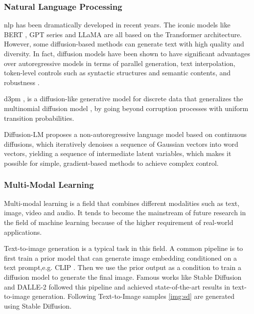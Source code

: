 \documentclass[12pt,DIV14,BCOR12mm,a4paper,footinclude=false,headinclude,parskip=half-,twoside,openright,cleardoublepage=empty,toc=index,bibliography=totoc,listof=totoc]{scrreprt}
\numberwithin{equation}{chapter}
\begin{document}
\subsubsection{Natural Language Processing}
\gls{nlp} has been dramatically developed in recent years. The iconic models like BERT \cite{devlin2019bert}, GPT series \cite{Radford2018ImprovingLU} and LLaMA \cite{touvron2023llama} are all based on the Transformer architecture. However, some diffusion-based methods can generate text with high quality and diversity. In fact, diffusion models have been shown to have significant advantages over autoregressive models in terms of parallel generation, text interpolation, token-level controls such as syntactic structures and semantic contents, and robustness \cite{zou2023survey}.

\gls{d3pm} \cite{austin2023structured}, is a diffusion-like generative model for discrete data that generalizes the multinomial diffusion model \cite{hoogeboom2021argmax}, by going beyond corruption processes with uniform transition probabilities. 

Diffusion-LM \cite{li2022diffusionlm} proposes a non-autoregressive language model based on continuous diffusions, which iteratively denoises a sequence of Gaussian vectors into word vectors, yielding a sequence of intermediate latent variables, which makes it possible for simple, gradient-based methods to achieve complex control.
\subsubsection{Multi-Modal Learning}
Multi-modal learning is a field that combines different modalities such as text, image, video and audio. It tends to become the mainstream of future research in the field of machine learning because of the higher requirement of real-world applications.

Text-to-image generation is a typical task in this field. A common pipeline is to first train a prior model that can generate image embedding conditioned on a text prompt,e.g. CLIP \cite{radford2021learning}. Then we use the prior output as a condition to train a diffusion model to generate the final image. Famous works like Stable Diffusion \cite{rombach2022highresolution} and DALLE-2 \cite{ramesh2022hierarchical} followed this pipeline and achieved state-of-the-art results in text-to-image generation. Following Text-to-Image samples \ref{img:sd} are generated using Stable Diffusion.
\end{document}
